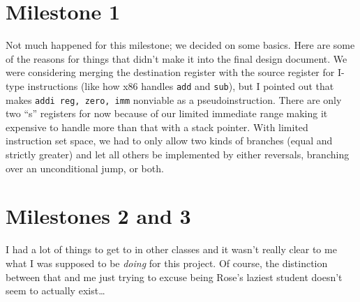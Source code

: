 \documentclass{report}
\begin{document}
\chapter{Milestone 1}
Not much happened for this milestone; we decided on some basics.
Here are some of the reasons for things that didn't make it into the final design document.
We were considering merging the destination register with the source register for I-type instructions (like how x86 handles \texttt{add} and \texttt{sub}), but I pointed out that makes \texttt{addi reg, zero, imm} nonviable as a pseudoinstruction.
There are only two ``s'' registers for now because of our limited immediate range making it expensive to handle more than that with a stack pointer.
With limited instruction set space, we had to only allow two kinds of branches (equal and strictly greater) and let all others be implemented by either reversals, branching over an unconditional jump, or both.
\chapter{Milestones 2 and 3}
I had a lot of things to get to in other classes and it wasn't really clear to me what I was supposed to be \textit{doing} for this project. Of course, the distinction between that and me just trying to excuse being Rose's laziest student doesn't seem to actually exist\ldots
\end{document}
